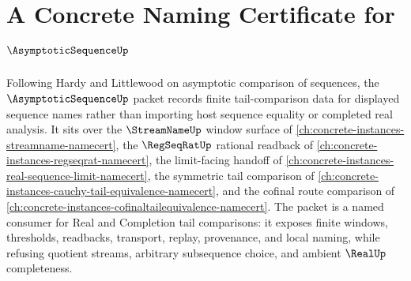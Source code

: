 \chapter{A Concrete Naming Certificate for $\AsymptoticSequenceUp$}
\label{ch:concrete-instances-asymptotic-sequence-namecert}

Following Hardy and Littlewood on asymptotic comparison of sequences, the $\AsymptoticSequenceUp$ packet records finite tail-comparison data for displayed sequence names rather than importing host sequence equality or completed real analysis. It sits over the $\StreamNameUp$ window surface of \autoref{ch:concrete-instances-streamname-namecert}, the $\RegSeqRatUp$ rational readback of \autoref{ch:concrete-instances-regseqrat-namecert}, the limit-facing handoff of \autoref{ch:concrete-instances-real-sequence-limit-namecert}, the symmetric tail comparison of \autoref{ch:concrete-instances-cauchy-tail-equivalence-namecert}, and the cofinal route comparison of \autoref{ch:concrete-instances-cofinaltailequivalence-namecert}. The packet is a named consumer for Real and Completion tail comparisons: it exposes finite windows, thresholds, readbacks, transport, replay, provenance, and local naming, while refusing quotient streams, arbitrary subsequence choice, and ambient $\RealUp$ completeness.

